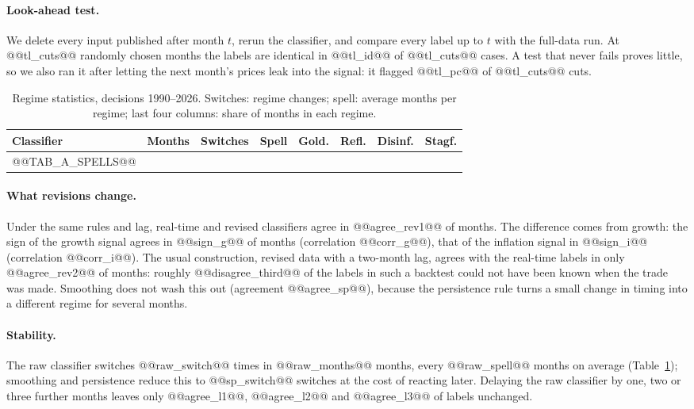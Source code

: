 \documentclass[11pt,a4paper]{article}
\begin{document}
\paragraph{Look-ahead test.} We delete every input published after month $t$, rerun the classifier, and compare
every label up to $t$ with the full-data run. At @@tl_cuts@@ randomly chosen months the labels are identical in
@@tl_id@@ of @@tl_cuts@@ cases. A test that never fails proves little, so we also ran it after letting the next
month's prices leak into the signal: it flagged @@tl_pc@@ of @@tl_cuts@@ cuts.

\begin{table}[htbp]
\centering
\caption{Regime statistics, decisions 1990--2026. Switches: regime changes; spell: average months per
regime; last four columns: share of months in each regime.}
\label{tab:spells}
\small
\begin{tabular}{@{}lrrrrrrr@{}}
\toprule
Classifier & Months & Switches & Spell & Gold. & Refl. & Disinf. & Stagf. \\
\midrule
@@TAB_A_SPELLS@@
\bottomrule
\end{tabular}
\end{table}

\paragraph{What revisions change.} Under the same rules and lag, real-time and revised classifiers agree in
@@agree_rev1@@ of months. The difference comes from growth: the sign of the growth signal agrees in
@@sign_g@@ of months (correlation @@corr_g@@), that of the inflation signal in @@sign_i@@ (correlation
@@corr_i@@). The usual construction, revised data with a two-month lag, agrees with the real-time labels in
only @@agree_rev2@@ of months: roughly @@disagree_third@@ of the labels in such a backtest could not have been
known when the trade was made. Smoothing does not wash this out (agreement @@agree_sp@@), because the
persistence rule turns a small change in timing into a different regime for several months.

\paragraph{Stability.} The raw classifier switches @@raw_switch@@ times in @@raw_months@@ months, every
@@raw_spell@@ months on average (Table~\ref{tab:spells}); smoothing and persistence reduce this to
@@sp_switch@@ switches at the cost of reacting later. Delaying the raw classifier by one, two or three further
months leaves only @@agree_l1@@, @@agree_l2@@ and @@agree_l3@@ of labels unchanged.
\end{document}
